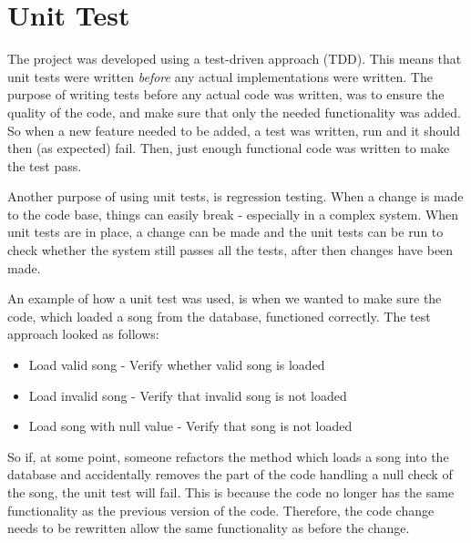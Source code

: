 \section{Unit Test}

The project was developed using a test-driven approach (TDD). This means that unit tests were written \textit{before} any actual implementations were written. The purpose of writing tests before any actual code was written, was to ensure the quality of the code, and make sure that only the needed functionality was added. So when a new feature needed to be added, a test was written, run and it should then (as expected) fail. Then, just enough functional code was written to make the test pass. 

Another purpose of using unit tests, is regression testing. When a change is made to the code base, things can easily break - especially in a complex system. When unit tests are in place, a change can be made and the unit tests can be run to check whether the system still passes all the tests, after then changes have been made.

An example of how a unit test was used, is when we wanted to make sure the code, which loaded a song from the database, functioned correctly. The test approach looked as follows:

\begin{itemize}
\item Load valid song
\subitem- Verify whether valid song is loaded
\item Load invalid song
\subitem- Verify that invalid song is not loaded
\item Load song with null value
\subitem- Verify that song is not loaded
\end{itemize} 

So if, at some point, someone refactors the method which loads a song into the database and accidentally removes the part of the code handling a null check of the song, the unit test will fail. This is because the code no longer has the same functionality as the previous version of the code. Therefore, the code change needs to be rewritten allow the same functionality as before the change.

